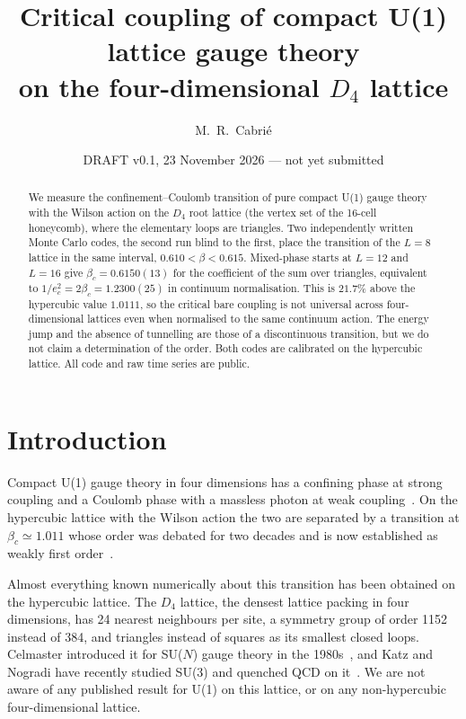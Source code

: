 \documentclass[aps,prd,twocolumn,superscriptaddress,floatfix,nofootinbib]{revtex4-2}
\begin{document}
\title{Critical coupling of compact U(1) lattice gauge theory\\ on the four-dimensional $D_4$ lattice}

\author{M.~R.~Cabri\'e}

\date{DRAFT v0.1, 23 November 2026 --- not yet submitted}

\begin{abstract}
We measure the confinement--Coulomb transition of pure compact U(1) gauge theory with the
Wilson action on the $D_4$ root lattice (the vertex set of the 16-cell honeycomb), where the
elementary loops are triangles. Two independently written Monte Carlo codes, the second run
blind to the first, place the transition of the $L=8$ lattice in the same interval,
$0.610<\beta<0.615$. Mixed-phase starts at $L=12$ and $L=16$ give
$\beta_c = 0.6150(13)$ for the coefficient of the sum over triangles, equivalent to
$1/e^2_c = 2\beta_c = 1.2300(25)$ in continuum normalisation. This is $21.7\%$ above the
hypercubic value $1.0111$, so the critical bare coupling is not universal across
four-dimensional lattices even when normalised to the same continuum action. The energy jump
and the absence of tunnelling are those of a discontinuous transition, but we do not claim a
determination of the order. Both codes are calibrated on the hypercubic lattice. All code and
raw time series are public.
\end{abstract}

\maketitle

\section{Introduction}

Compact U(1) gauge theory in four dimensions has a confining phase at strong coupling and a
Coulomb phase with a massless photon at weak coupling~\cite{Wilson1974,BMK1977,Guth1980,FS1982}.
On the hypercubic lattice with the Wilson action the two are separated by a transition at
$\beta_c \simeq 1.011$ whose order was debated for two decades and is now established as weakly
first order~\cite{JNZ1983,Arnold2003}.

Almost everything known numerically about this transition has been obtained on the hypercubic
lattice. The $D_4$ lattice, the densest lattice packing in four dimensions, has 24 nearest
neighbours per site, a symmetry group of order 1152 instead of 384, and triangles instead of
squares as its smallest closed loops. Celmaster introduced it for SU($N$) gauge theory in the
1980s~\cite{Celmaster1982}, and Katz and Nogradi have recently studied SU(3) and quenched QCD
on it~\cite{KatzNogradi2026}. We are not aware of any published result for U(1) on this lattice,
or on any non-hypercubic four-dimensional lattice.
\end{document}
